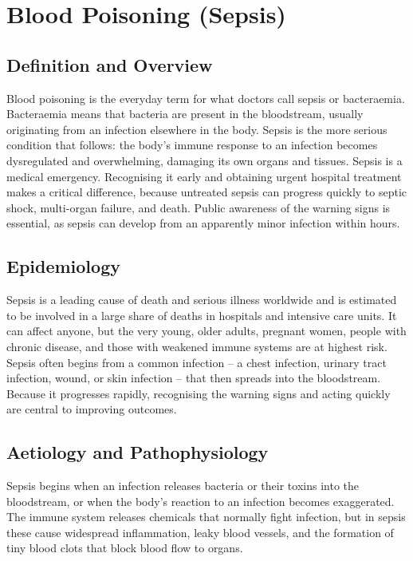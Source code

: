\chapter{Blood Poisoning (Sepsis)}

\section*{Definition and Overview}
Blood poisoning is the everyday term for what doctors call sepsis or bacteraemia. Bacteraemia means that bacteria are present in the bloodstream, usually originating from an infection elsewhere in the body. Sepsis is the more serious condition that follows: the body's immune response to an infection becomes dysregulated and overwhelming, damaging its own organs and tissues. Sepsis is a medical emergency. Recognising it early and obtaining urgent hospital treatment makes a critical difference, because untreated sepsis can progress quickly to septic shock, multi-organ failure, and death. Public awareness of the warning signs is essential, as sepsis can develop from an apparently minor infection within hours.

\section*{Epidemiology}
Sepsis is a leading cause of death and serious illness worldwide and is estimated to be involved in a large share of deaths in hospitals and intensive care units. It can affect anyone, but the very young, older adults, pregnant women, people with chronic disease, and those with weakened immune systems are at highest risk. Sepsis often begins from a common infection -- a chest infection, urinary tract infection, wound, or skin infection -- that then spreads into the bloodstream. Because it progresses rapidly, recognising the warning signs and acting quickly are central to improving outcomes.

\section*{Aetiology and Pathophysiology}
Sepsis begins when an infection releases bacteria or their toxins into the bloodstream, or when the body's reaction to an infection becomes exaggerated. The immune system releases chemicals that normally fight infection, but in sepsis these cause widespread inflammation, leaky blood vessels, and the formation of tiny blood clots that block blood flow to organs.

